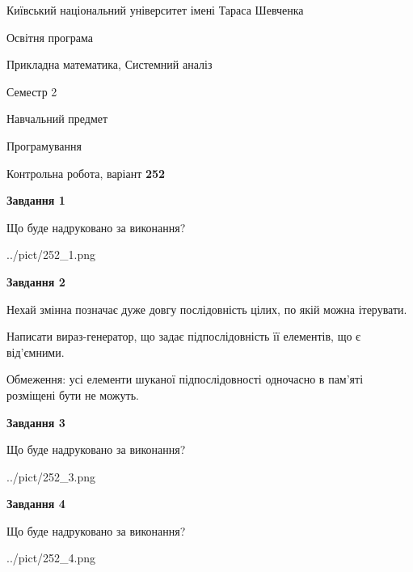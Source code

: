 \documentclass[12pt, ukrainian]{article}
\begin{document}
{{\begin {small}\par
{ \center  Київський національний університет імені Тараса Шевченка \par}
{\parbox {5 cm}{Освітня програма \hfill}{\parbox {8 cm}{Прикладна математика, Системний аналіз \hfill}}\parbox {5 cm}{\hfill Семестр 2}}\par
{\parbox {5 cm} {Навчальний предмет \hfill}\parbox {7 cm}{Програмування \hfill}\parbox {6cm}{\hfill}\par}\vspace{-7pt} \end{small}}{\center Контрольна робота, варіант  \No \textbf
{ 252 }\par}}
{
\begin {large}
{\begin {center}\textbf{Завдання 1}\end {center}}\par
Що буде надруковано за виконання?\par\par
\begin{center}
	{../pict/252_1.png}
\end{center}
\newpage

{\begin {center}\textbf{Завдання 2}\end {center}}\par
Нехай змінна  позначає дуже довгу послідовність цілих, по якій можна ітерувати.

Написати вираз-генератор, що задає підпослідовність її елементів, що є від'єм\-ни\-ми.

Обмеження: усі елементи шуканої підпослідовності одночасно в пам'яті розміщені бути не можуть.\par
\newpage

{\begin {center}\textbf{Завдання 3}\end {center}}\par
Що буде надруковано за виконання?
\begin{center}
	{../pict/252_3.png}
\end{center}
\newpage

{\begin {center}\textbf{Завдання 4}\end {center}}\par
Що буде надруковано за виконання?\par
\begin{center}
	{../pict/252_4.png}
\end{center}
\newpage


\end{large}}
\end{document}
